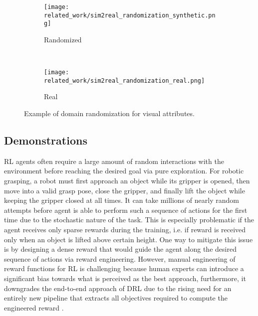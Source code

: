 \begin{figure}[ht]
    \centering
    \begin{subfigure}[ht]{0.745\textwidth}
        \centering
        \texttt{[image: related\_work/sim2real\_randomization\_synthetic.png]}
        \caption*{Randomized}
    \end{subfigure}%
    ~
    \begin{subfigure}[ht]{0.245\textwidth}
        \centering
        \texttt{[image: related\_work/sim2real\_randomization\_real.png]}
        \caption*{Real}
    \end{subfigure}%
    \caption{Example of domain randomization for visual attributes. \cite{tobin_domain_2017}}
    \label{fig:sim2real_domain_randomization}
\end{figure}


\subsection{Demonstrations}

RL agents often require a large amount of random interactions with the environment before reaching the desired goal via pure exploration. For robotic grasping, a robot must first approach an object while its gripper is opened, then move into a valid grasp pose, close the gripper, and finally lift the object while keeping the gripper closed at all times. It can take millions of nearly random attempts before agent is able to perform such a sequence of actions for the first time due to the stochastic nature of the task. This is especially problematic if the agent receives only sparse rewards during the training, i.e. if reward is received only when an object is lifted above certain height. One way to mitigate this issue is by designing a dense reward that would guide the agent along the desired sequence of actions via reward engineering. However, manual engineering of reward functions for RL is challenging because human experts can introduce a significant bias towards what is perceived as the best approach, furthermore, it downgrades the end-to-end approach of DRL due to the rising need for an entirely new pipeline that extracts all objectives required to compute the engineered reward \cite{singh_end--end_2019}.

